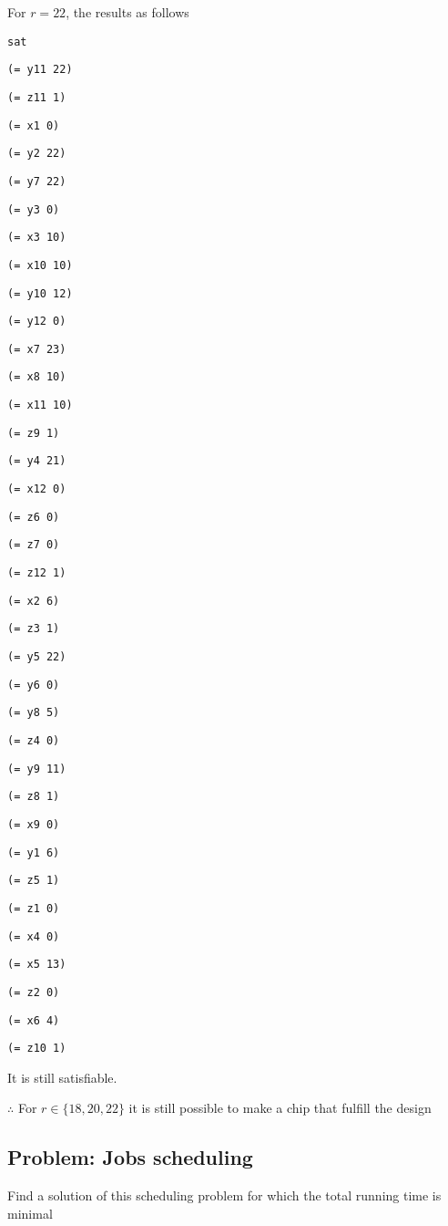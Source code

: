 \documentclass[12pt]{article}
\begin{document}
For $r=22$, the results as follows 
{\footnotesize

{\tt sat }

{\tt  }

{\tt (= y11 22) }

{\tt (= z11 1) }

{\tt (= x1 0) }

{\tt (= y2 22) }

{\tt (= y7 22) }

{\tt (= y3 0) }

{\tt (= x3 10) }

{\tt (= x10 10) }

{\tt (= y10 12) }

{\tt (= y12 0) }

{\tt (= x7 23) }

{\tt (= x8 10) }

{\tt (= x11 10) }

{\tt (= z9 1) }

{\tt (= y4 21) }

{\tt (= x12 0) }

{\tt (= z6 0) }

{\tt (= z7 0) }

{\tt (= z12 1) }

{\tt (= x2 6) }

{\tt (= z3 1) }

{\tt (= y5 22) }

{\tt (= y6 0) }

{\tt (= y8 5) }

{\tt (= z4 0) }

{\tt (= y9 11) }

{\tt (= z8 1) }

{\tt (= x9 0) }

{\tt (= y1 6) }

{\tt (= z5 1) }

{\tt (= z1 0) }

{\tt (= x4 0) }

{\tt (= x5 13) }

{\tt (= z2 0) }

{\tt (= x6 4) }

{\tt (= z10 1) }

{\tt  }

{\tt  }	
}

It is still satisfiable.

$\therefore$ For $r\in\{18,20,22\}$ it is still possible to make a chip that fulfill the design

\subsection*{Problem: Jobs scheduling}
Find a solution of this scheduling problem for which the total running time is minimal
\end{document}
